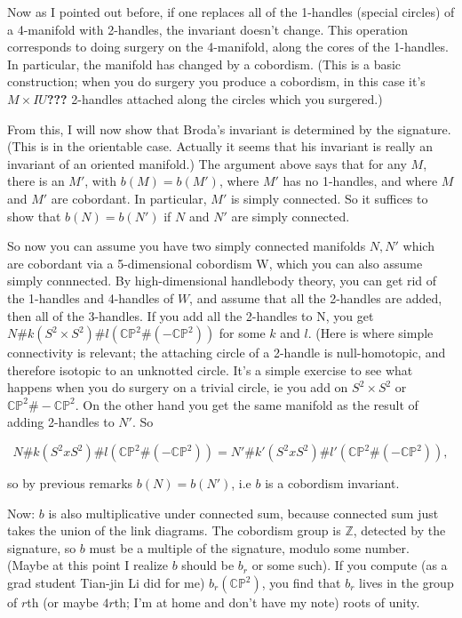\documentclass{article}
\begin{document}
Now as I pointed out before, if one replaces all of the 1-handles
(special circles) of a 4-manifold with 2-handles, the invariant doesn't
change. This operation corresponds to doing surgery on the 4-manifold,
along the cores of the 1-handles. In particular, the manifold has
changed by a cobordism. (This is a basic construction; when you do
surgery you produce a cobordism, in this case it's
\(M \times I U\)\textbf{???} 2-handles attached along the circles which
you surgered.)

From this, I will now show that Broda's invariant is determined by the
signature. (This is in the orientable case. Actually it seems that his
invariant is really an invariant of an oriented manifold.) The argument
above says that for any \(M\), there is an \(M'\), with
\(b(M) = b(M')\), where \(M'\) has no 1-handles, and where \(M\) and
\(M'\) are cobordant. In particular, \(M'\) is simply connected. So it
suffices to show that \(b(N) = b(N')\) if \(N\) and \(N'\) are simply
connected.

So now you can assume you have two simply connected manifolds \(N,N'\)
which are cobordant via a 5-dimensional cobordism W, which you can also
assume simply connnected. By high-dimensional handlebody theory, you can
get rid of the 1-handles and 4-handles of \(W\), and assume that all the
2-handles are added, then all of the 3-handles. If you add all the
2-handles to N, you get
\(N\#k(S^2 \times S^2)\#l(\mathbb{CP}^2\#(-\mathbb{CP}^2))\) for some
\(k\) and \(l\). (Here is where simple connectivity is relevant; the
attaching circle of a 2-handle is null-homotopic, and therefore isotopic
to an unknotted circle. It's a simple exercise to see what happens when
you do surgery on a trivial circle, ie you add on \(S^2 \times S^2\) or
\(\mathbb{CP}^2 \# -\mathbb{CP}^2\). On the other hand you get the same
manifold as the result of adding 2-handles to \(N'\). So

\[N\#k(S^2 x S^2)\#l(\mathbb{CP}^2\#(-\mathbb{CP}^2)) = N'\#k'(S^2 x S^2)\#l'(\mathbb{CP}^2\#(-\mathbb{CP}^2)),\]

so by previous remarks \(b(N) = b(N')\), i.e \(b\) is a cobordism
invariant.

Now: \(b\) is also multiplicative under connected sum, because connected
sum just takes the union of the link diagrams. The cobordism group is
\(\mathbb{Z}\), detected by the signature, so \(b\) must be a multiple
of the signature, modulo some number. (Maybe at this point I realize
\(b\) should be \(b_r\) or some such). If you compute (as a grad student
Tian-jin Li did for me) \(b_r(\mathbb{CP}^2)\), you find that \(b_r\)
lives in the group of \(r\)th (or maybe \(4r\)th; I'm at home and don't
have my note) roots of unity.
\end{document}
